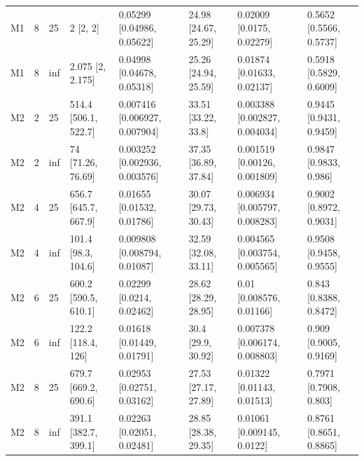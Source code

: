 \begin{tabular}{llllllll}
M1 & 8 & 25 & 2 [2, 2] & 0.05299 [0.04986, 0.05622] & 24.98 [24.67, 25.29] & 0.02009 [0.0175, 0.02279] & 0.5652 [0.5566, 0.5737] \\
M1 & 8 & inf & 2.075 [2, 2.175] & 0.04998 [0.04678, 0.05318] & 25.26 [24.94, 25.59] & 0.01874 [0.01633, 0.02137] & 0.5918 [0.5829, 0.6009] \\
M2 & 2 & 25 & 514.4 [506.1, 522.7] & 0.007416 [0.006927, 0.007904] & 33.51 [33.22, 33.8] & 0.003388 [0.002827, 0.004034] & 0.9445 [0.9431, 0.9459] \\
M2 & 2 & inf & 74 [71.26, 76.69] & 0.003252 [0.002936, 0.003576] & 37.35 [36.89, 37.84] & 0.001519 [0.00126, 0.001809] & 0.9847 [0.9833, 0.986] \\
M2 & 4 & 25 & 656.7 [645.7, 667.9] & 0.01655 [0.01532, 0.01786] & 30.07 [29.73, 30.43] & 0.006934 [0.005797, 0.008283] & 0.9002 [0.8972, 0.9031] \\
M2 & 4 & inf & 101.4 [98.3, 104.6] & 0.009808 [0.008794, 0.01087] & 32.59 [32.08, 33.11] & 0.004565 [0.003754, 0.005565] & 0.9508 [0.9458, 0.9555] \\
M2 & 6 & 25 & 600.2 [590.5, 610.1] & 0.02299 [0.0214, 0.02462] & 28.62 [28.29, 28.95] & 0.01 [0.008576, 0.01166] & 0.843 [0.8388, 0.8472] \\
M2 & 6 & inf & 122.2 [118.4, 126] & 0.01618 [0.01449, 0.01791] & 30.4 [29.9, 30.92] & 0.007378 [0.006174, 0.008803] & 0.909 [0.9005, 0.9169] \\
M2 & 8 & 25 & 679.7 [669.2, 690.6] & 0.02953 [0.02751, 0.03162] & 27.53 [27.17, 27.89] & 0.01322 [0.01143, 0.01513] & 0.7971 [0.7908, 0.803] \\
M2 & 8 & inf & 391.1 [382.7, 399.1] & 0.02263 [0.02051, 0.02481] & 28.85 [28.38, 29.35] & 0.01061 [0.009145, 0.0122] & 0.8761 [0.8651, 0.8865] \\
\hline
\end{tabular}
